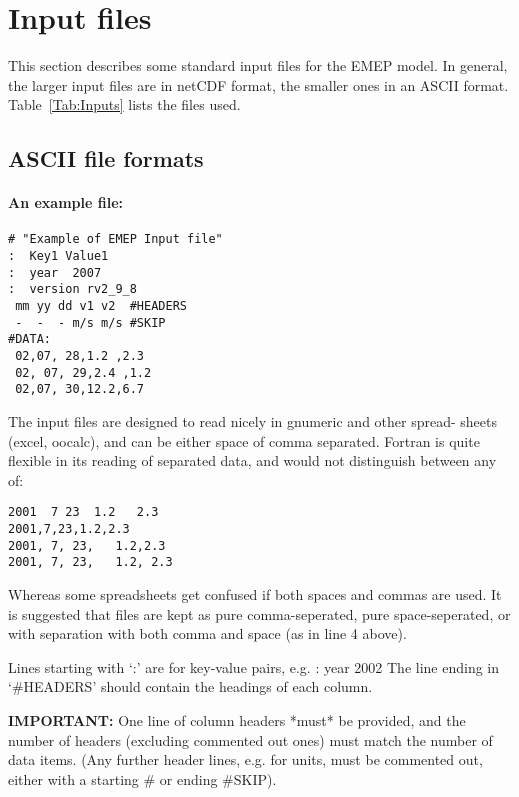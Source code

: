 \chapter{Input files}

This section describes some standard input files for the
EMEP model. In general, the larger input files
are in netCDF format, the smaller ones in an ASCII format.
Table~\ref{Tab:Inputs} lists the files used.

\section{ASCII file formats}


\subsubsection*{An example file:}

\begin{verbatim}
# "Example of EMEP Input file"
:  Key1 Value1
:  year  2007
:  version rv2_9_8
 mm yy dd v1 v2  #HEADERS
 -  -  - m/s m/s #SKIP 
#DATA:
 02,07, 28,1.2 ,2.3
 02, 07, 29,2.4 ,1.2
 02,07, 30,12.2,6.7
\end{verbatim}

\bigskip

 The input files are designed to read nicely in gnumeric and other spread-
 sheets (excel, oocalc), and can be either space of comma separated.
 Fortran is quite flexible in its reading of separated data, and
would not distinguish between any of:
\begin{verbatim}
2001  7 23  1.2   2.3
2001,7,23,1.2,2.3
2001, 7, 23,   1.2,2.3
2001, 7, 23,   1.2, 2.3
\end{verbatim}

Whereas some spreadsheets get confused if both spaces and commas
are used. It is suggested that files are kept as 
pure comma-seperated,
pure space-seperated,
or with separation with both comma and space (as in line 4 above).
\bigskip

Lines starting with `:' are for key-value pairs, e.g. : year 2002
The line ending in `\#HEADERS' should contain the headings of each column.
\bigskip

{\bf IMPORTANT:} One line of column headers *must* be provided, and the
 number of headers (excluding commented out ones)  must match the number of data items.
(Any further header lines, e.g. for units, must be commented out, either with
a starting \# or ending \#SKIP).

